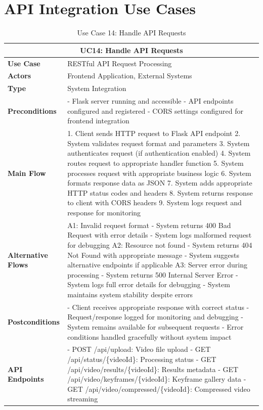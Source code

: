 \documentclass{article}
\begin{document}
\section{API Integration Use Cases}

\begin{table}[H]
\centering
\begin{tabularx}{\textwidth}{|l|X|}
\hline
\multicolumn{2}{|c|}{\textbf{UC14: Handle API Requests}} \\ \hline
\textbf{Use Case} & RESTful API Request Processing \\ \hline
\textbf{Actors} & Frontend Application, External Systems \\ \hline
\textbf{Type} & System Integration \\ \hline
\textbf{Preconditions} & 
- Flask server running and accessible
- API endpoints configured and registered
- CORS settings configured for frontend integration \\ \hline
\textbf{Main Flow} & 
1. Client sends HTTP request to Flask API endpoint
2. System validates request format and parameters
3. System authenticates request (if authentication enabled)
4. System routes request to appropriate handler function
5. System processes request with appropriate business logic
6. System formats response data as JSON
7. System adds appropriate HTTP status codes and headers
8. System returns response to client with CORS headers
9. System logs request and response for monitoring \\ \hline
\textbf{Alternative Flows} & 
A1: Invalid request format
- System returns 400 Bad Request with error details
- System logs malformed request for debugging
A2: Resource not found
- System returns 404 Not Found with appropriate message
- System suggests alternative endpoints if applicable
A3: Server error during processing
- System returns 500 Internal Server Error
- System logs full error details for debugging
- System maintains system stability despite errors \\ \hline
\textbf{Postconditions} & 
- Client receives appropriate response with correct status
- Request/response logged for monitoring and debugging
- System remains available for subsequent requests
- Error conditions handled gracefully without system impact \\ \hline
\textbf{API Endpoints} & 
- POST /api/upload: Video file upload
- GET /api/status/\{videoId\}: Processing status
- GET /api/video/results/\{videoId\}: Results metadata
- GET /api/video/keyframes/\{videoId\}: Keyframe gallery data
- GET /api/video/compressed/\{videoId\}: Compressed video streaming \\ \hline
\end{tabularx}
\caption{Use Case 14: Handle API Requests}
\end{table}
\end{document}
